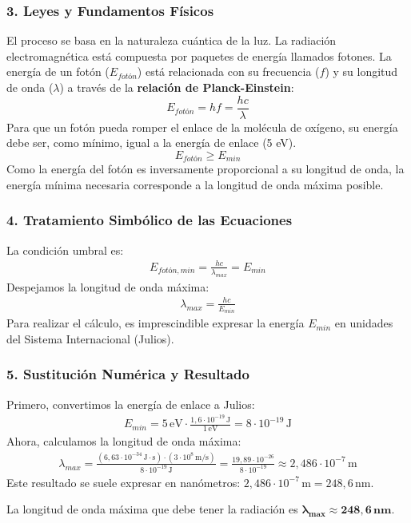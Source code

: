 \subsubsection*{3. Leyes y Fundamentos Físicos}
El proceso se basa en la naturaleza cuántica de la luz. La radiación electromagnética está compuesta por paquetes de energía llamados fotones. La energía de un fotón ($E_{fotón}$) está relacionada con su frecuencia ($f$) y su longitud de onda ($\lambda$) a través de la \textbf{relación de Planck-Einstein}:
$$ E_{fotón} = h f = \frac{hc}{\lambda} $$
Para que un fotón pueda romper el enlace de la molécula de oxígeno, su energía debe ser, como mínimo, igual a la energía de enlace (5 eV).
$$ E_{fotón} \ge E_{min} $$
Como la energía del fotón es inversamente proporcional a su longitud de onda, la energía mínima necesaria corresponde a la longitud de onda máxima posible.

\subsubsection*{4. Tratamiento Simbólico de las Ecuaciones}
La condición umbral es:
\begin{gather}
    E_{fotón, min} = \frac{hc}{\lambda_{max}} = E_{min}
\end{gather}
Despejamos la longitud de onda máxima:
\begin{gather}
    \lambda_{max} = \frac{hc}{E_{min}}
\end{gather}
Para realizar el cálculo, es imprescindible expresar la energía $E_{min}$ en unidades del Sistema Internacional (Julios).

\subsubsection*{5. Sustitución Numérica y Resultado}
Primero, convertimos la energía de enlace a Julios:
\begin{gather}
    E_{min} = 5\,\text{eV} \cdot \frac{1,6 \cdot 10^{-19}\,\text{J}}{1\,\text{eV}} = 8 \cdot 10^{-19}\,\text{J}
\end{gather}
Ahora, calculamos la longitud de onda máxima:
\begin{gather}
    \lambda_{max} = \frac{(6,63 \cdot 10^{-34}\,\text{J}\cdot\text{s}) \cdot (3 \cdot 10^8\,\text{m/s})}{8 \cdot 10^{-19}\,\text{J}} = \frac{19,89 \cdot 10^{-26}}{8 \cdot 10^{-19}} \approx 2,486 \cdot 10^{-7}\,\text{m}
\end{gather}
Este resultado se suele expresar en nanómetros: $2,486 \cdot 10^{-7}\,\text{m} = 248,6\,\text{nm}$.
\begin{cajaresultado}
    La longitud de onda máxima que debe tener la radiación es $\boldsymbol{\lambda_{max} \approx 248,6\,\textbf{nm}}$.
\end{cajaresultado}


